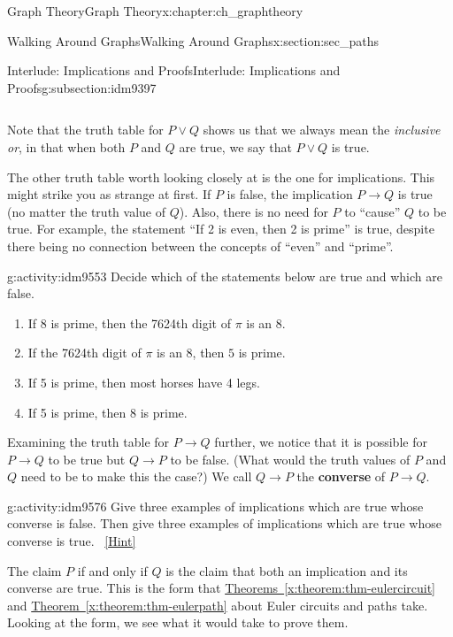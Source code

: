 \documentclass[oneside,10pt,]{book}
\newcommand{\terminology}[1]{\textbf{#1}}
\numberwithin{equation}{chapter}
\def\imp{\rightarrow}
\begin{document}
\begin{chapterptx}{Graph Theory}{}{Graph Theory}{}{}{x:chapter:ch_graphtheory}
\begin{sectionptx}{Walking Around Graphs}{}{Walking Around Graphs}{}{}{x:section:sec_paths}
\begin{subsectionptx}{Interlude: Implications and Proofs}{}{Interlude: Implications and Proofs}{}{}{g:subsection:idm9397}
\begin{sidebyside}{4}{0.025}{0.025}{0.05}
\begin{sbspanel}{0.2}
{\begin{tabular}{cBc}
\end{tabular}
\par}
\end{sbspanel}%
\end{sidebyside}%
\par
Note that the truth table for \(P \vee Q\) shows us that we always mean the \emph{inclusive or}, in that when both \(P\) and \(Q\) are true, we say that \(P \vee Q\) is true.%
\par
The other truth table worth looking closely at is the one for implications.  This might strike you as strange at first.  If \(P\) is false, the implication \(P \imp Q\) is true (no matter the truth value of \(Q\)).  Also, there is no need for \(P\) to ``cause'' \(Q\) to be true.  For example, the statement ``If 2 is even, then 2 is prime'' is true, despite there being no connection between the concepts of ``even'' and ``prime''.%
\begin{activity}{}{g:activity:idm9553}%
Decide which of the statements below are true and which are false.%
\begin{enumerate}[font=\bfseries,label=(\alph*),ref=\alph*]
\item{}If 8 is prime, then the 7624th digit of \(\pi\) is an 8.%
\item{}If the 7624th digit of \(\pi\) is an 8, then \(5\) is prime.%
\item{}If 5 is prime, then most horses have 4 legs.%
\item{}If 5 is prime, then 8 is prime.%
\end{enumerate}
\end{activity}
Examining the truth table for \(P \imp Q\) further, we notice that it is possible for \(P \imp Q\) to be true but \(Q \imp P\) to be false. (What would the truth values of \(P\) and \(Q\) need to be to make this the case?) We call \(Q \imp P\) the \terminology{converse} of \(P \imp Q\).%
\begin{activity}{}{g:activity:idm9576}%
Give three examples of implications which are true whose converse is false.  Then give three examples of implications which are true whose converse is true.%
\qquad~\hfill{\tiny\hyperlink{g:hint:idm9579-back}{[Hint]}}\end{activity}
The claim \(P\) if and only if \(Q\) is the claim that both an implication and its converse are true.  This is the form that \hyperref[x:theorem:thm-eulercircuit]{Theorems~\ref{x:theorem:thm-eulercircuit}} and \hyperref[x:theorem:thm-eulerpath]{Theorem~\ref{x:theorem:thm-eulerpath}} about Euler circuits and paths take.  Looking at the form, we see what it would take to prove them.%

\end{subsectionptx}
\end{sectionptx}
\end{chapterptx}
\end{document}
